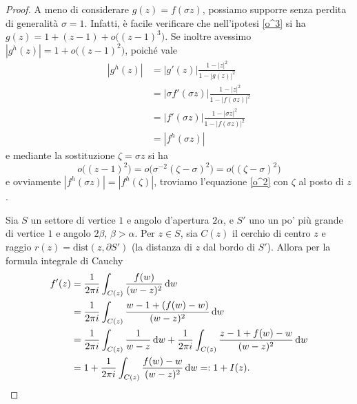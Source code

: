 \begin{proof}
  A meno di considerare $g(z)=f(\sigma z)$, possiamo supporre senza perdita di generalità $\sigma=1$. Infatti, è facile verificare che nell'ipotesi \eqref{o^3} si ha $g(z)=1+(z-1)+o\bigl((z-1)^3\bigr)$. Se inoltre avessimo $|g^h(z)|=1+o\bigl((z-1)^2\bigr)$, poiché vale
  \begin{align*}
    |g^h(z)| & =|g'(z)|\frac{1-|z|^2}{1-|g(z)|^2} \\
    & =|\sigma f'(\sigma z)|\frac{1-|z|^2}{1-|f(\sigma z)|^2} \\
    & =|f'(\sigma z)|\frac{1-|\sigma z|^2}{1-|f(\sigma z)|^2} \\
    & =|f^h(\sigma z)|
  \end{align*}
  e mediante la sostituzione $\zeta=\sigma z$ si ha
  $$o\bigl((z-1)^2\bigr)=o\bigl(\sigma^{-2}(\zeta-\sigma)^2\bigr)=o\bigl((\zeta-\sigma)^2\bigr)$$
  e ovviamente $|f^h(\sigma z)|=|f^h(\zeta)|$, troviamo l'equazione \eqref{o^2} con $\zeta$ al posto di $z$.

  Sia $S$ un settore di vertice $1$ e angolo d'apertura $2\alpha$, e $S'$ uno un po' più grande di vertice $1$ e angolo $2\beta$, $\beta>\alpha$. Per $z \in S$, sia $C(z)$ il cerchio di centro $z$ e raggio $r(z)=\text{dist}(z, \partial S')$ (la distanza di $z$ dal bordo di $S'$). Allora per la formula integrale di Cauchy
  \begin{align*}
    f'(z) & =\frac{1}{2\pi i} \int_{C(z)} \frac{f(w)}{(w-z)^2}\mathop{}\!\mathrm{d} w \\
    & =\frac{1}{2\pi i} \int_{C(z)} \frac{w-1+(f(w)-w)}{(w-z)^2}\mathop{}\!\mathrm{d} w \\
    & =\frac{1}{2\pi i} \int_{C(z)} \frac{1}{w-z}\mathop{}\!\mathrm{d} w+\frac{1}{2\pi i} \int_{C(z)} \frac{z-1+f(w)-w}{(w-z)^2}\mathop{}\!\mathrm{d} w \\
    & =1+\frac{1}{2\pi i} \int_{C(z)} \frac{f(w)-w}{(w-z)^2}\mathop{}\!\mathrm{d} w=:1+I(z).
  \end{align*}


\end{proof}
